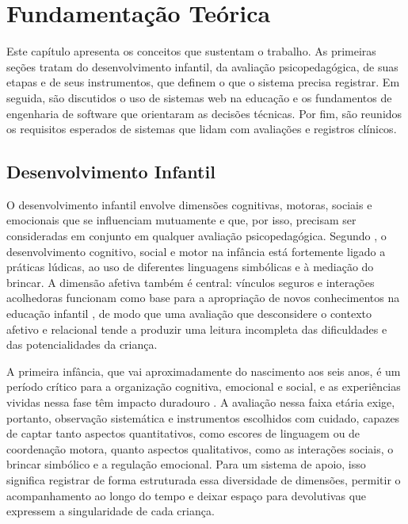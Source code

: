 \chapter[Fundamentação Teórica]{Fundamentação Teórica}\label{capitulo3-0}

Este capítulo apresenta os conceitos que sustentam o trabalho. As primeiras seções tratam do desenvolvimento infantil, da avaliação psicopedagógica, de suas etapas e de seus instrumentos, que definem o que o sistema precisa registrar. Em seguida, são discutidos o uso de sistemas web na educação e os fundamentos de engenharia de software que orientaram as decisões técnicas. Por fim, são reunidos os requisitos esperados de sistemas que lidam com avaliações e registros clínicos.

\section{Desenvolvimento Infantil}

O desenvolvimento infantil envolve dimensões cognitivas, motoras, sociais e emocionais que se influenciam mutuamente e que, por isso, precisam ser consideradas em conjunto em qualquer avaliação psicopedagógica. Segundo , o desenvolvimento cognitivo, social e motor na infância está fortemente ligado a práticas lúdicas, ao uso de diferentes linguagens simbólicas e à mediação do brincar. A dimensão afetiva também é central: vínculos seguros e interações acolhedoras funcionam como base para a apropriação de novos conhecimentos na educação infantil \cite{Felix_Oliveira_Junior_2022}, de modo que uma avaliação que desconsidere o contexto afetivo e relacional tende a produzir uma leitura incompleta das dificuldades e das potencialidades da criança.

A primeira infância, que vai aproximadamente do nascimento aos seis anos, é um período crítico para a organização cognitiva, emocional e social, e as experiências vividas nessa fase têm impacto duradouro \cite{cpapi2021_primeira_infancia}. A avaliação nessa faixa etária exige, portanto, observação sistemática e instrumentos escolhidos com cuidado, capazes de captar tanto aspectos quantitativos, como escores de linguagem ou de coordenação motora, quanto aspectos qualitativos, como as interações sociais, o brincar simbólico e a regulação emocional. Para um sistema de apoio, isso significa registrar de forma estruturada essa diversidade de dimensões, permitir o acompanhamento ao longo do tempo e deixar espaço para devolutivas que expressem a singularidade de cada criança.

